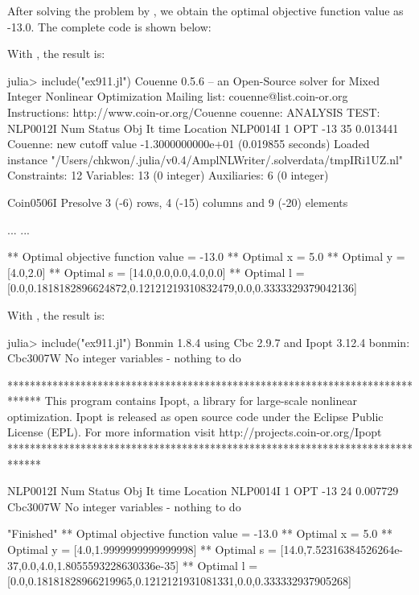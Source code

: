 After solving the problem by , we obtain the optimal objective function value as -13.0. The complete code is shown below:
\begin{codelisting}
\end{codelisting}

With , the result is:
{\tiny
\begin{code}
julia> include("ex911.jl")
Couenne 0.5.6 -- an Open-Source solver for Mixed Integer Nonlinear Optimization
Mailing list: couenne@list.coin-or.org
Instructions: http://www.coin-or.org/Couenne
couenne:
ANALYSIS TEST: NLP0012I
              Num      Status      Obj             It       time                 Location
NLP0014I             1         OPT -13       35 0.013441
Couenne: new cutoff value -1.3000000000e+01 (0.019855 seconds)
Loaded instance "/Users/chkwon/.julia/v0.4/AmplNLWriter/.solverdata/tmpIRi1UZ.nl"
Constraints:           12
Variables:             13 (0 integer)
Auxiliaries:            6 (0 integer)

Coin0506I Presolve 3 (-6) rows, 4 (-15) columns and 9 (-20) elements

...
...

** Optimal objective function value = -13.0
** Optimal x = 5.0
** Optimal y = [4.0,2.0]
** Optimal s = [14.0,0.0,0.0,4.0,0.0]
** Optimal l = [0.0,0.1818182896624872,0.12121219310832479,0.0,0.3333329379042136]
\end{code}
}

With , the result is:
{\tiny
\begin{code}
julia> include("ex911.jl")
Bonmin 1.8.4 using Cbc 2.9.7 and Ipopt 3.12.4
bonmin:
Cbc3007W No integer variables - nothing to do

******************************************************************************
This program contains Ipopt, a library for large-scale nonlinear optimization.
 Ipopt is released as open source code under the Eclipse Public License (EPL).
         For more information visit http://projects.coin-or.org/Ipopt
******************************************************************************

NLP0012I
              Num      Status      Obj             It       time                 Location
NLP0014I             1         OPT -13       24 0.007729
Cbc3007W No integer variables - nothing to do

 	"Finished"
** Optimal objective function value = -13.0
** Optimal x = 5.0
** Optimal y = [4.0,1.9999999999999998]
** Optimal s = [14.0,7.52316384526264e-37,0.0,4.0,1.8055593228630336e-35]
** Optimal l = [0.0,0.18181828966219965,0.1212121931081331,0.0,0.333332937905268]
\end{code}
}

